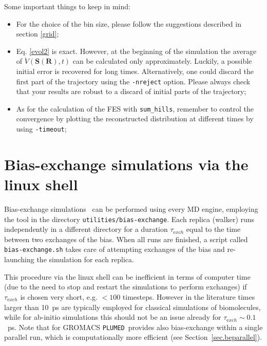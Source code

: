 \documentclass[12pt,fleqn]{report}
\newcommand{\plumed}{{\tt PLUMED}}
\begin{document}
Some important things to keep in mind:
\begin{itemize}
\item For the choice of the bin size, please follow the suggestions described in section \ref{grid};
\item Eq. \ref{evol2} is exact. However, at the beginning of the simulation the
average of $\dot{V}(\bm{S}(\bm{R}),t)$ can be calculated only approximately.
Luckily, a possible initial error is recovered for long times. 
Alternatively, one could discard the first part of the trajectory using the {\tt -nreject} option.
Please always check that your results are robust to a discard of initial parts of the trajectory;
\item As for the calculation of the FES with {\tt sum\_hills}, remember to control the convergence
by plotting the reconstructed distribution at different times by using {\tt -timeout}; 
\end{itemize}

\section{Bias-exchange simulations via the linux shell}
\label{sec.betool}

Bias-exchange simulations~\cite{piana} can be performed using every MD engine, employing the tool in the
directory {\tt utilities/bias-exchange}. Each replica (walker) runs independently in a different directory
for a duration $\tau_{\mathrm exch}$ equal to the time between two exchanges of the bias. When all runs are finished, 
a script called {\tt bias-exchange.sh} takes care of attempting exchanges of the bias and re-launching
the simulation for each replica. 

This procedure via the linux shell can be inefficient in terms of computer time (due to the need to stop and restart the simulations
to perform exchanges)
if $\tau_{\mathrm exch}$ is chosen very short, e.g. $<100$ timesteps. However in the literature times larger than 10~ps are typically employed
for classical simulations of biomolecules, while for ab-initio simulations this should not be an issue already for $\tau_{\mathrm exch}\sim 0.1$~ps.
Note that for GROMACS \plumed\  provides also bias-exchange within a single parallel run, which is computationally more efficient
(see Section~\ref{sec.beparallel}).
\end{document}
